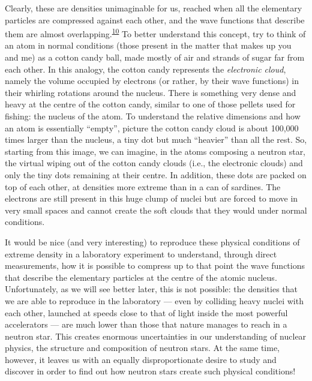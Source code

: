 Clearly, these are densities unimaginable for us, reached when all the elementary
particles are compressed against each other, and the wave functions that describe them
are almost overlapping.\textsuperscript{\hyperlink{note:05-10}{10}} To better understand this concept, try to
think of an atom in normal conditions (those present in the matter that makes up you and
me) as a cotton candy ball, made mostly of air and strands of sugar far from each other.
In this analogy, the cotton candy represents the \emph{electronic cloud}, namely the
volume occupied by electrons (or rather, by their wave functions) in
their whirling rotations around the nucleus. There is something very dense and heavy at
the centre of the cotton candy, similar to one of those pellets used for fishing: the
nucleus of the atom. To understand the relative dimensions and how an atom is
essentially ``empty'', picture the cotton candy cloud is about 100,000 times larger than
the nucleus, a tiny dot but much ``heavier'' than all the rest. So, starting from this
image, we can imagine, in the atoms composing a neutron star, the virtual wiping out of
the cotton candy clouds (i.e., the electronic clouds) and only the tiny dots remaining
at their centre. In addition, these dots are packed on top of each other, at densities
more extreme than in a can of sardines. The electrons are still present in this huge
clump of nuclei but are forced to move in very small spaces and cannot create the soft
clouds that they would under normal conditions.

It would be nice (and very interesting) to reproduce these physical conditions of
extreme density in a laboratory experiment to understand, through direct measurements,
how it is possible to compress up to that point the wave functions that describe the
elementary particles at the centre of the atomic nucleus. Unfortunately, as we will see
better later, this is not possible: the densities that we are able to reproduce in the
laboratory --- even by colliding heavy nuclei with each other, launched at speeds close
to that of light inside the most powerful accelerators --- are much lower than those
that nature manages to reach in a neutron star. This creates enormous uncertainties in
our understanding of nuclear physics, the structure and composition of neutron stars. At
the same time, however, it leaves us with an equally disproportionate desire to study
and discover in order to find out how neutron stars create such physical conditions!

